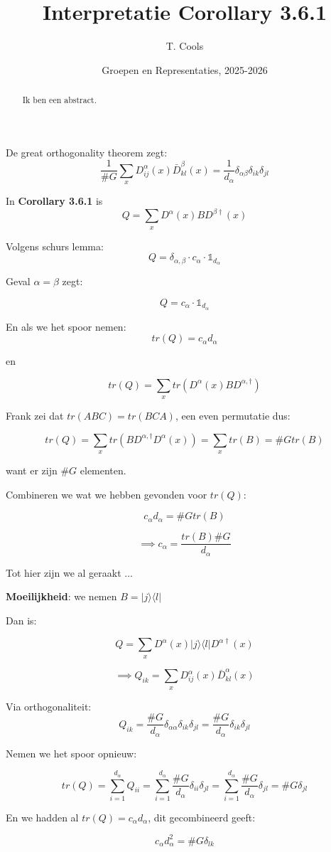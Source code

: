 \documentclass[a4paper,twoside]{article}
\title{Interpretatie Corollary 3.6.1}
\author{T. Cools}
\date{Groepen en Representaties, 2025-2026}
\theoremstyle{definition}
\theoremstyle{plain}
\begin{document}
\maketitle

\begin{abstract}
    Ik ben een abstract.
\end{abstract}

De great orthogonality theorem zegt:
\[
\frac{1}{\#G}\sum_{x} D_{ij}^{\alpha}(x) \bar{D}_{kl}^{\beta}(x) = \frac{1}{d_\alpha} \delta_{\alpha\beta} \delta_{ik} \delta_{jl}
\]

In \textbf{Corollary 3.6.1} is 
\[Q = \sum_{x} D^\alpha (x) B D^{\beta \dagger} (x)\]


Volgens schurs lemma:  \[Q = \delta_{\alpha, \beta} \cdot c_\alpha \cdot \mathds{1}_{d_\alpha}\]





Geval \(\alpha = \beta\) zegt:

\[
Q =  c_\alpha \cdot \mathds{1}_{d_\alpha}
\]

En als we het spoor nemen: 
\[tr(Q) = c_\alpha d_\alpha\]

en 

\[tr(Q) = \sum_{x} tr(D^\alpha(x)BD^{\alpha, \dagger}) \]

Frank zei dat \(tr(ABC) = tr(BCA)\), een even permutatie dus:

\[tr(Q) = \sum_{x} tr(BD^{\alpha, \dagger} D^\alpha(x)) = \sum_{x} tr(B) = \#Gtr(B) \]

want er zijn \(\#G\) elementen.

Combineren we wat we hebben gevonden voor \(tr(Q)\):

\[c_\alpha d_\alpha = \#G tr(B) \]

\[\implies c_\alpha = \frac{tr(B) \# G}{ d_\alpha}\]


Tot hier zijn we al geraakt \(\dots\)

\textbf{Moeilijkheid}: we nemen \(B = |j \rangle \langle l|\)

Dan is:

 \[Q = \sum_{x} D^\alpha (x) |j \rangle \langle l| D^{\alpha \dagger} (x)\]

\[\implies Q_{ik} = \sum_{x} D^\alpha_{ij}(x) \bar{D}^\alpha_{kl}(x)\]

Via orthogonaliteit:
\[
Q_{ik}
 = 
\frac{\#G}{d_\alpha} \delta_{\alpha \alpha} \delta_{ik} \delta_{jl} 
=
 \frac{\#G}{d_\alpha} \delta_{ik} \delta_{jl} 
\]



Nemen we het spoor opnieuw:

\[tr(Q) 
=
 \sum_{i=1}^{d_\alpha}Q_{ii} 
 = \sum_{i=1}^{d_\alpha}\frac{\#G}{d_\alpha} \delta_{ii} \delta_{jl}
 = \sum_{i=1}^{d_\alpha}\frac{\#G}{d_\alpha} \delta_{jl}
 = \#G \delta_{jl}
\]

En we hadden al \(tr(Q) = c_\alpha d_\alpha\), dit gecombineerd geeft:

\[c_\alpha d_\alpha^2 = \#G \delta_{lk} \]
\end{document}
